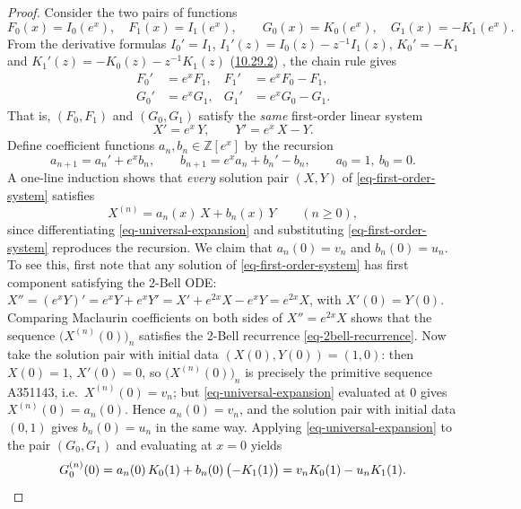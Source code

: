 \documentclass[a4paper]{amsart}
\numberwithin{equation}{section}
\begin{document}
\begin{proof}
Consider the two pairs of functions
%
\[
F_0(x) = I_0(e^x), \quad F_1(x) = I_1(e^x), \qquad G_0(x) = K_0(e^x), \quad G_1(x) = -K_1(e^x).
\]
%
From the derivative formulas $I_0' = I_1$, $I_1'(z) = I_0(z) - z^{-1}I_1(z)$, $K_0' = -K_1$ and $K_1'(z) = -K_0(z) - z^{-1}K_1(z)$ (\href{https://dlmf.nist.gov/10.29.E2}{10.29.2}) \cite{NIST:DLMF}, the chain rule gives
%
\[
\begin{aligned}
F_0' &= e^x F_1, & F_1' &= e^x F_0 - F_1,\\
G_0' &= e^x G_1, & G_1' &= e^x G_0 - G_1.
\end{aligned}
\]
%
That is, $(F_0, F_1)$ and $(G_0, G_1)$ satisfy the \emph{same} first-order linear system
\begin{equation}\label{eq-first-order-system}
X' = e^x\,Y, \qquad Y' = e^x\,X - Y.
\end{equation}
Define coefficient functions $a_n, b_n \in \mathbb{Z}[e^x]$ by the recursion
%
\[
a_{n+1} = a_n' + e^x b_n, \qquad b_{n+1} = e^x a_n + b_n' - b_n, \qquad a_0 = 1,\ b_0 = 0.
\]
%
A one-line induction shows that \emph{every} solution pair $(X, Y)$ of \eqref{eq-first-order-system} satisfies
\begin{equation}\label{eq-universal-expansion}
X^{(n)} = a_n(x)\,X + b_n(x)\,Y \qquad (n \geq 0),
\end{equation}
since differentiating \eqref{eq-universal-expansion} and substituting \eqref{eq-first-order-system} reproduces the recursion. We claim that $a_n(0) = v_n$ and $b_n(0) = u_n$. To see this, first note that any solution of \eqref{eq-first-order-system} has first component satisfying the 2-Bell ODE: $X'' = (e^xY)' = e^xY + e^xY' = X' + e^{2x}X - e^xY = e^{2x}X$, with $X'(0) = Y(0)$. Comparing Maclaurin coefficients on both sides of $X'' = e^{2x}X$ shows that the sequence $\big(X^{(n)}(0)\big)_n$ satisfies the 2-Bell recurrence \eqref{eq-2bell-recurrence}. Now take the solution pair with initial data $(X(0), Y(0)) = (1, 0)$: then $X(0) = 1$, $X'(0) = 0$, so $\big(X^{(n)}(0)\big)_n$ is precisely the primitive sequence A351143, i.e.\ $X^{(n)}(0) = v_n$; but \eqref{eq-universal-expansion} evaluated at $0$ gives $X^{(n)}(0) = a_n(0)$. Hence $a_n(0) = v_n$, and the solution pair with initial data $(0,1)$ gives $b_n(0) = u_n$ in the same way. Applying \eqref{eq-universal-expansion} to the pair $(G_0, G_1)$ and evaluating at $x = 0$ yields
\[
G_0^{(n)}(0) = a_n(0)\, K_0(1) + b_n(0)\, \big({-}K_1(1)\big) = v_n K_0(1) - u_n K_1(1). \qedhere
\]
\end{proof}
\end{document}

